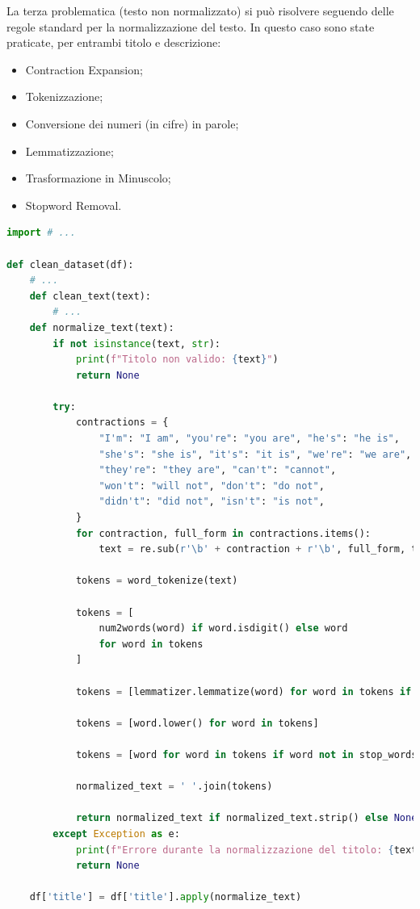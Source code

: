 \documentclass[a4paper,12pt]{report}
\begin{document}
La terza problematica (testo non normalizzato) si può risolvere seguendo delle regole standard per la normalizzazione del testo. In questo caso sono state praticate, per entrambi titolo e descrizione:
\begin{itemize}
        \item Contraction Expansion;
        \item Tokenizzazione;
        \item Conversione dei numeri (in cifre) in parole;
        \item Lemmatizzazione;
        \item Trasformazione in Minuscolo;
        \item Stopword Removal.
\end{itemize}
\begin{lstlisting}[language=Python]
import # ...

def clean_dataset(df):
    # ...
    def clean_text(text):
        # ...
    def normalize_text(text):
        if not isinstance(text, str):
            print(f"Titolo non valido: {text}")
            return None

        try:
            contractions = {
                "I'm": "I am", "you're": "you are", "he's": "he is",
                "she's": "she is", "it's": "it is", "we're": "we are",
                "they're": "they are", "can't": "cannot",
                "won't": "will not", "don't": "do not",
                "didn't": "did not", "isn't": "is not",
            }
            for contraction, full_form in contractions.items():
                text = re.sub(r'\b' + contraction + r'\b', full_form, text)

            tokens = word_tokenize(text)

            tokens = [
                num2words(word) if word.isdigit() else word
                for word in tokens
            ]

            tokens = [lemmatizer.lemmatize(word) for word in tokens if word]

            tokens = [word.lower() for word in tokens]

            tokens = [word for word in tokens if word not in stop_words]

            normalized_text = ' '.join(tokens)

            return normalized_text if normalized_text.strip() else None
        except Exception as e:
            print(f"Errore durante la normalizzazione del titolo: {text}. Errore: {e}")
            return None
        
    df['title'] = df['title'].apply(normalize_text)
\end{lstlisting}
\end{document}
